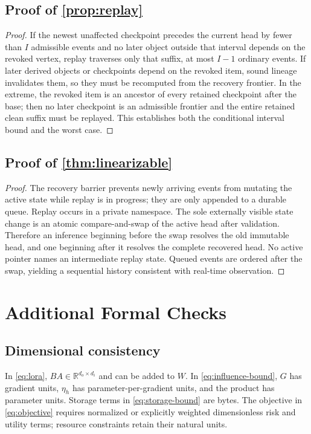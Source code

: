 \subsection{Proof of \cref{prop:replay}}

\begin{proof}
If the newest unaffected checkpoint precedes the current head by fewer than $I$ admissible events and no later object outside that interval depends on the revoked vertex, replay traverses only that suffix, at most $I-1$ ordinary events. If later derived objects or checkpoints depend on the revoked item, sound lineage invalidates them, so they must be recomputed from the recovery frontier. In the extreme, the revoked item is an ancestor of every retained checkpoint after the base; then no later checkpoint is an admissible frontier and the entire retained clean suffix must be replayed. This establishes both the conditional interval bound and the worst case.
\end{proof}

\subsection{Proof of \cref{thm:linearizable}}

\begin{proof}
The recovery barrier prevents newly arriving events from mutating the active state while replay is in progress; they are only appended to a durable queue. Replay occurs in a private namespace. The sole externally visible state change is an atomic compare-and-swap of the active head after validation. Therefore an inference beginning before the swap resolves the old immutable head, and one beginning after it resolves the complete recovered head. No active pointer names an intermediate replay state. Queued events are ordered after the swap, yielding a sequential history consistent with real-time observation.
\end{proof}

\section{Additional Formal Checks}

\subsection{Dimensional consistency}

In \cref{eq:lora}, $BA\in\mathbb{R}^{d_o\times d_i}$ and can be added to $W$. In \cref{eq:influence-bound}, $G$ has gradient units, $\eta_h$ has parameter-per-gradient units, and the product has parameter units. Storage terms in \cref{eq:storage-bound} are bytes. The objective in \cref{eq:objective} requires normalized or explicitly weighted dimensionless risk and utility terms; resource constraints retain their natural units.

